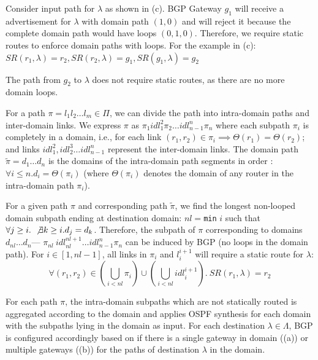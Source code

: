  \label{sec:static}
Consider input path for $\lambda$ 
as shown in (c). BGP Gateway $g_1$ 
will receive a advertisement for $\lambda$ with domain
path $(1,0)$ and will reject it because the complete
domain path would have loops $(0,1,0)$. 
Therefore, we require static routes 
to enforce domain paths with loops. For the example in 
(c): \\
\hspace*{0.7cm}$SR(r_1,\lambda) = r_2, SR(r_2,\lambda) = g_1, SR(g_1,\lambda) = g_2$ 

\noindent The path from $g_2$ to $\lambda$ does not 
require static routes, as there are no more domain loops.

For a path $\pi = l_1 l_2 \ldots l_m \in \Pi$, we
can divide the path into intra-domain paths and inter-domain
links. We express $\pi$ as 
$\pi_1 idl_1^2 \pi_2 \ldots idl_{n-1}^n \pi_n$ where
each subpath $\pi_i$ is completely in a
domain, i.e., for each 
link $(r_1,r_2) \in \pi_i \implies \Theta(r_1) = \Theta(r_2)$;
and links $idl_1^2, idl_2^3 \ldots idl_{n-1}^n$ 
represent the inter-domain links. The domain path
$\tilde{\pi} = d_1 \ldots d_n$ is the 
domains of the intra-domain path segments in order
: $\forall i \leq n. d_i = \Theta(\pi_i)$ (where
$\Theta(\pi_i)$ denotes the domain of any router in the 
intra-domain path $\pi_i$). 


For a given path $\pi$ and corresponding path $\tilde{\pi}$,
we find the longest non-looped domain subpath ending at
destination domain: $nl = $\texttt{min} $i$ such that
$\forall j \geq i. ~\not\exists k \geq i. d_j = d_k$. 
Therefore, the subpath of $\pi$ corresponding to
domains $d_{nl} \ldots d_n$--- $\pi_{nl} ~idl_{nl}^{nl+1}\ldots idl_{n-1}^n \pi_n$
can be induced by BGP (no loops in the domain path).
For $i \in [1,nl-1]$, all links in $\pi_i$ 
and $l_i^{i+1}$ 
will require a static route for $\lambda$: 
\begin{equation}
\forall (r_1, r_2) \in (\bigcup_{i < nl} \pi_i) \cup (\bigcup_{i < nl} idl_i^{i+1}). ~SR(r_1, \lambda) = r_2
\end{equation}

\noindent 
For each path $\pi$, the intra-domain subpaths which are
not statically routed is aggregated according to the domain 
and \name applies
OSPF synthesis for each domain with the subpaths lying 
in the domain as input. For each destination $\lambda \in \Lambda$, 
BGP is configured accordingly
based on if there is a single gateway in domain ((a))
or multiple gateways ((b)) for the paths of destination
$\lambda$ in the domain. 



